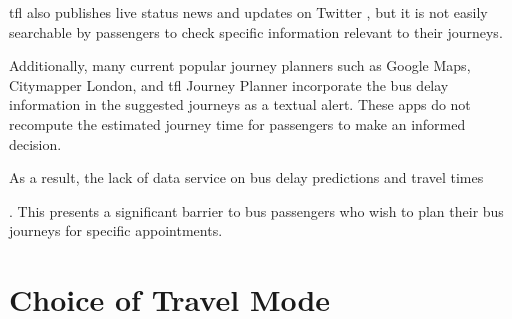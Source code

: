 \par \acrshort{tfl} also publishes live status news and updates on Twitter \cite{tfl_bus_alerts_twitter}, but it is not easily searchable by passengers to check specific information relevant to their journeys.

\par Additionally, many current popular journey planners such as Google Maps\cite{google_maps}, Citymapper London\cite{citymapper}, and \acrshort{tfl} Journey Planner incorporate the bus delay information in the suggested journeys as a textual alert. These apps do not recompute the estimated journey time for passengers to make an informed decision.

\par As a result, the lack of data service on bus delay predictions and travel times



. This presents a significant barrier to bus passengers who wish to plan their bus journeys for specific appointments.

\section{Choice of Travel Mode}
